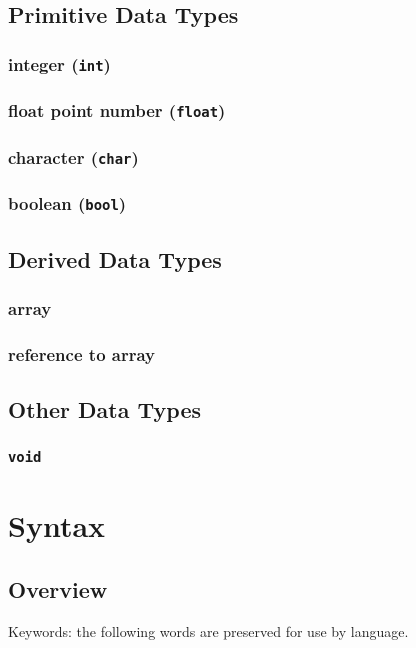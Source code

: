 \documentclass[a4paper, 11.5pt]{article}
\newcommand{\ci}[1]{\texttt{#1}}
\begin{document}
\begin{multicols}{2}
    \subsection{Primitive Data Types}
      \subsubsection{integer (\ci{int})}
      \subsubsection{float point number (\ci{float})}
      \subsubsection{character (\ci{char})}
      \subsubsection{boolean (\ci{bool})}

    \subsection{Derived Data Types}
      \subsubsection{array}
      \subsubsection{reference to array}

    \subsection{Other Data Types}
      \subsubsection{\ci{void}}
  \section{Syntax}

    \subsection{Overview}

    Keywords: the following words are preserved for use by language.
   

\end{multicols}
\end{document}
